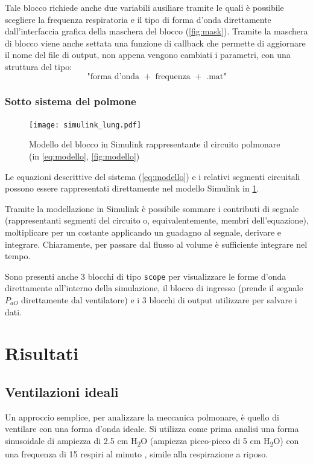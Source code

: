Tale blocco richiede anche due variabili ausiliare tramite le quali è possibile scegliere la frequenza respiratoria e il tipo di forma d'onda direttamente dall'interfaccia grafica della maschera del blocco (\cref{fig:mask}). Tramite la maschera di blocco viene anche settata una funzione di callback che permette di aggiornare il nome del file di output, non appena vengono cambiati i parametri, con una struttura del tipo:
\begin{equation*}
	\text{"forma d'onda } + \text{ frequenza } + \text{ .mat"}
\end{equation*}


\subsubsection{Sotto sistema del polmone}


\begin{figure}[t!]
	\centering
	\texttt{[image: simulink\_lung.pdf]}
	\caption{Modello del blocco in Simulink rappresentante il circuito polmonare (in \cref{eq:modello}, \cref{fig:modello})}
	\label{fig:simulinkLung}
\end{figure}

Le equazioni descrittive del sistema (\cref{eq:modello}) e i relativi segmenti circuitali possono essere rappresentati direttamente nel modello Simulink in \cref{fig:simulinkLung}. 

Tramite la modellazione in Simulink è possibile sommare i contributi di segnale (rappresentanti segmenti del circuito o, equivalentemente, membri dell'equazione), moltiplicare per un costante applicando un guadagno al segnale, derivare e integrare. 
Chiaramente, per passare dal flusso al volume è sufficiente integrare nel tempo. 

Sono presenti anche 3 blocchi di tipo \texttt{scope} per visualizzare le forme d'onda direttamente all'interno della simulazione, il blocco di ingresso (prende il segnale $P_{aO}$ direttamente dal ventilatore) e i 3 blocchi di output utilizzare per salvare i dati. 


\section{Risultati}

\subsection{Ventilazioni ideali}

Un approccio semplice, per analizzare la meccanica polmonare, è quello di ventilare con una forma d'onda ideale. Si utilizza come prima analisi una forma sinusoidale di ampiezza di 2.5 cm H\textsubscript{2}O (ampiezza picco-picco di 5 cm H\textsubscript{2}O) con una frequenza di 15 respiri al minuto \cite{khoo_physiological_2018}, simile alla respirazione a riposo.


